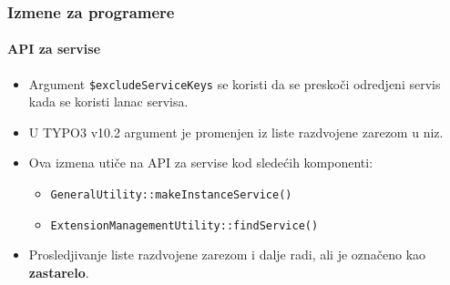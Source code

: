 \begin{frame}[fragile]
	\frametitle{Izmene za programere}
	\framesubtitle{API za servise}

	\begin{itemize}
		\item Argument \texttt{\$excludeServiceKeys} se koristi da se preskoči odredjeni servis kada se koristi lanac servisa.
		\item U TYPO3 v10.2 argument je promenjen iz liste razdvojene zarezom u niz.
		\item Ova izmena utiče na API za servise kod sledećih komponenti:

			\begin{itemize}
				\item \texttt{GeneralUtility::makeInstanceService()}
				\item \texttt{ExtensionManagementUtility::findService()}
			\end{itemize}

		\item Prosledjivanje liste razdvojene zarezom i dalje radi, ali je označeno kao \textbf{zastarelo}.

	\end{itemize}

\end{frame}

